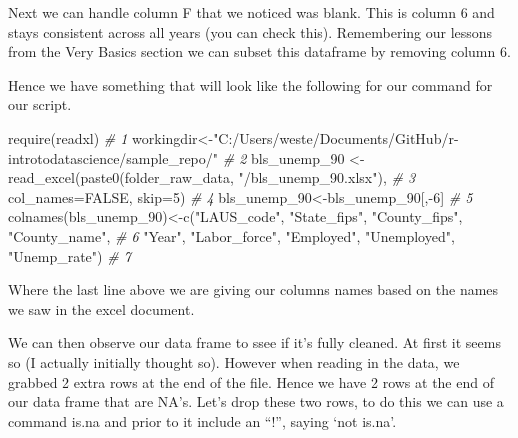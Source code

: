 \documentclass[
]{book}
\newenvironment{Shaded}{\begin{snugshade}}{\end{snugshade}}
\newcommand{\AttributeTok}[1]{\textcolor[rgb]{0.77,0.63,0.00}{#1}}
\newcommand{\CommentTok}[1]{\textcolor[rgb]{0.56,0.35,0.01}{\textit{#1}}}
\newcommand{\ConstantTok}[1]{\textcolor[rgb]{0.00,0.00,0.00}{#1}}
\newcommand{\DecValTok}[1]{\textcolor[rgb]{0.00,0.00,0.81}{#1}}
\newcommand{\FunctionTok}[1]{\textcolor[rgb]{0.00,0.00,0.00}{#1}}
\newcommand{\NormalTok}[1]{#1}
\newcommand{\OtherTok}[1]{\textcolor[rgb]{0.56,0.35,0.01}{#1}}
\newcommand{\SpecialCharTok}[1]{\textcolor[rgb]{0.00,0.00,0.00}{#1}}
\newcommand{\StringTok}[1]{\textcolor[rgb]{0.31,0.60,0.02}{#1}}
\begin{document}
Next we can handle column F that we noticed was blank. This is column 6 and stays consistent across all years (you can check this). Remembering our lessons from the Very Basics section we can subset this dataframe by removing column 6.

Hence we have something that will look like the following for our command for our script.

\begin{Shaded}
\begin{Highlighting}[]
\FunctionTok{require}\NormalTok{(readxl)                                                                           }\CommentTok{\# 1}
\NormalTok{workingdir}\OtherTok{\textless{}{-}}\StringTok{"C:/Users/weste/Documents/GitHub/r{-}introtodatascience/sample\_repo/"}           \CommentTok{\# 2}
\NormalTok{bls\_unemp\_90 }\OtherTok{\textless{}{-}} \FunctionTok{read\_excel}\NormalTok{(}\FunctionTok{paste0}\NormalTok{(folder\_raw\_data, }\StringTok{"/bls\_unemp\_90.xlsx"}\NormalTok{),                 }\CommentTok{\# 3}
                           \AttributeTok{col\_names=}\ConstantTok{FALSE}\NormalTok{, }\AttributeTok{skip=}\DecValTok{5}\NormalTok{)                                       }\CommentTok{\# 4}
\NormalTok{bls\_unemp\_90}\OtherTok{\textless{}{-}}\NormalTok{bls\_unemp\_90[,}\SpecialCharTok{{-}}\DecValTok{6}\NormalTok{]                                                           }\CommentTok{\# 5}
\FunctionTok{colnames}\NormalTok{(bls\_unemp\_90)}\OtherTok{\textless{}{-}}\FunctionTok{c}\NormalTok{(}\StringTok{"LAUS\_code"}\NormalTok{, }\StringTok{"State\_fips"}\NormalTok{, }\StringTok{"County\_fips"}\NormalTok{, }\StringTok{"County\_name"}\NormalTok{,        }\CommentTok{\# 6}
                          \StringTok{"Year"}\NormalTok{, }\StringTok{"Labor\_force"}\NormalTok{, }\StringTok{"Employed"}\NormalTok{, }\StringTok{"Unemployed"}\NormalTok{, }\StringTok{"Unemp\_rate"}\NormalTok{)  }\CommentTok{\# 7}
\end{Highlighting}
\end{Shaded}

Where the last line above we are giving our columns names based on the names we saw in the excel document.

We can then observe our data frame to ssee if it's fully cleaned. At first it seems so (I actually initially thought so). However when reading in the data, we grabbed 2 extra rows at the end of the file. Hence we have 2 rows at the end of our data frame that are NA's. Let's drop these two rows, to do this we can use a command is.na and prior to it include an ``!'', saying `not is.na'.
\end{document}
